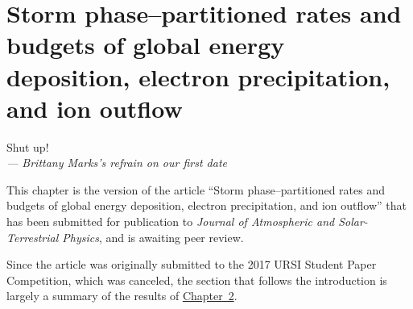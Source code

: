 
\chapter{Storm phase--partitioned rates and budgets of global \Alfic
  energy deposition, electron precipitation, and ion outflow}
\label{chp:3}

\begin{flushright}
  \begin{minipage}[]{0.5\linewidth}
    \begin{flushright}
      Shut up!  \\{\small \emph{--- Brittany Marks's refrain on our first date } }
    \end{flushright}
  \end{minipage}
\end{flushright}
\vspace{\baselineskip}

This chapter is the version of the article ``Storm phase--partitioned
rates and budgets of global \Alfic energy deposition, electron
precipitation, and ion outflow'' that has been submitted for
publication to \emph{Journal of Atmospheric and Solar-Terrestrial
  Physics}, and is awaiting peer review.

Since the article was originally submitted to the 2017 URSI Student
Paper Competition, which was canceled, the section that follows the
introduction is largely a summary of the results of
\hyperref[chp:2]{Chapter~2}.

